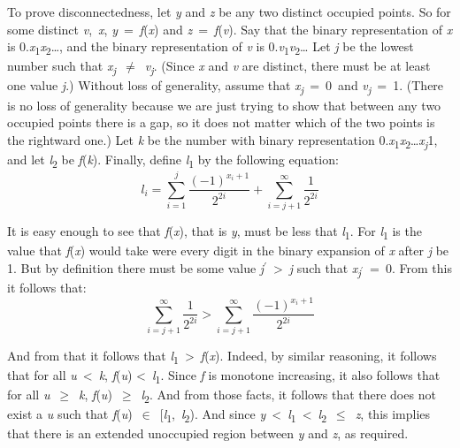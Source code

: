 To prove disconnectedness, let \textit{y} and \textit{z} be any two distinct occupied points. So for some distinct \textit{v},~\textit{x}, \textit{y}~=~\textit{f}(\textit{x}) and \textit{z}~=~\textit{f}(\textit{v}). Say that the binary representation of \textit{x} is 0.\textit{x}\textsubscript{1}\textit{x}\textsubscript{2}{\dots}, and the binary representation of \textit{v} is 0.\textit{v}\textsubscript{1}\textit{v}\textsubscript{2}{\dots} Let \textit{j} be the lowest number such that \textit{x}\textit{\textsubscript{j}}~${\neq}$~\textit{v}\textit{\textsubscript{j}}. (Since \textit{x} and \textit{v} are distinct, there must be at least one value \textit{j}.) Without loss of generality, assume that \textit{x}\textit{\textsubscript{j}}~=~0~and \textit{v}\textit{\textsubscript{j}}~=~1. (There is no loss of generality because we are just trying to show that between any two occupied points there is a gap, so it does not matter which of the two points is the rightward one.) Let \textit{k} be the number with binary representation 0.\textit{x}\textsubscript{1}\textit{x}\textsubscript{2}{\dots}\textit{x}\textit{\textsubscript{j}}\textsubscript{}1, and let \textit{l}\textsubscript{2} be \textit{f}(\textit{k}). Finally, define \textit{l}\textsubscript{1} by the following equation:
\begin{equation}
l_i = \sum_{i=1}^j \frac{(-1)^{x_i+1}}{2^{2i}} + \sum_{i = j+1}^\infty \frac{1}{2^{2i}}
\end{equation}

\noindent It is easy enough to see that \textit{f}(\textit{x}), that is \textit{y}, must be less that \textit{l}\textsubscript{1}. For \textit{l}\textsubscript{1} is the value that \textit{f}(\textit{x}) would take were every digit in the binary expansion of \textit{x} after \textit{j} be 1. But by definition there must be some value \textit{j}\(^\prime\)~{\textgreater}~\textit{j} such that \textit{x}\textit{\textsubscript{j}}\textsubscript{\(^\prime\)}~=~0. From this it follows that:
\begin{equation}
\sum_{i = j+1}^\infty \frac{1}{2^{2i}} > \sum_{i = j+1}^\infty \frac{(-1)^{x_i+1}}{2^{2i}}
\end{equation}

\noindent And from that it follows that \textit{l}\textsubscript{1}~{\textgreater}~\textit{f}(\textit{x}). Indeed, by similar reasoning, it follows that for all \textit{u}~{\textless}~\textit{k}, \textit{f}(\textit{u}) {\textless}~\textit{l}\textsubscript{1}. Since \textit{f} is monotone increasing, it also follows that for all \textit{u}~${\geq}$~\textit{k}, \textit{f}(\textit{u})~${\geq}$~\textit{l}\textsubscript{2}. And from those facts, it follows that there does not exist a \textit{u} such that \textit{f}(\textit{u})~${\in}$~[\textit{l}\textsubscript{1},~\textit{l}\textsubscript{2}). And since \textit{y}~{\textless}~\textit{l}\textsubscript{1}~{\textless}~\textit{l}\textsubscript{2}~${\leq}$~\textit{z}, this implies that there is an extended unoccupied region between \textit{y} and \textit{z}, as required.

